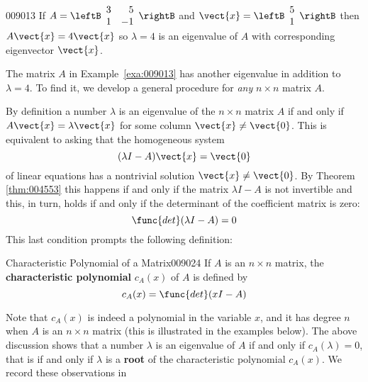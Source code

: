 \begin{example}{}{009013}
If $A = \leftB \begin{array}{rr}
3 & 5 \\
1 & -1 
\end{array}\rightB$
 and $\vect{x} = \leftB \begin{array}{r}
5 \\
1
\end{array}\rightB$
 then $A\vect{x} = 4 \vect{x}$ so $\lambda = 4$
 is an eigenvalue of $A$ with corresponding eigenvector $\vect{x}$.
\end{example}

The matrix $A$ in Example~\ref{exa:009013} has another eigenvalue in addition to $\lambda = 4$. To find it, we develop a general procedure for \textit{any} $n \times n$ matrix $A$.


By definition a number $\lambda$ is an eigenvalue of the $n \times n$ matrix $A$ if and only if $A\vect{x} = \lambda\vect{x}$ for some column $\vect{x} \neq \vect{0}$. This is equivalent to asking that the homogeneous system
\begin{equation*}
(\lambda I - A)\vect{x} = \vect{0}
\end{equation*}
of linear equations has a nontrivial solution $\vect{x} \neq \vect{0}$. By Theorem \ref{thm:004553} this happens if and only if the matrix $\lambda I - A$ is not invertible and this, in turn, holds if and only if the determinant of the coefficient matrix is zero:
\begin{equation*}
\func{det}(\lambda I -A)=0
\end{equation*}
This last condition prompts the following definition:


\begin{definition}{Characteristic Polynomial of a Matrix}{009024}
If $A$ is an $n \times n$ matrix, the \textbf{characteristic polynomial} $c_{A}(x)$ of $A$ is defined by
\begin{equation*}
c_A(x) = \func{det}(xI - A)
\end{equation*}
\end{definition}

\noindent Note that $c_{A}(x)$ is indeed a polynomial in the variable $x$, and it has degree $n$ when $A$ is an $n \times n$ matrix (this is illustrated in the examples below). The above discussion shows that a number $\lambda$ is an eigenvalue of $A$ if and only if $c_{A}(\lambda) = 0$, that is if and only if $\lambda$ is a \textbf{root} of the characteristic polynomial $c_{A}(x)$. We record these observations in 

